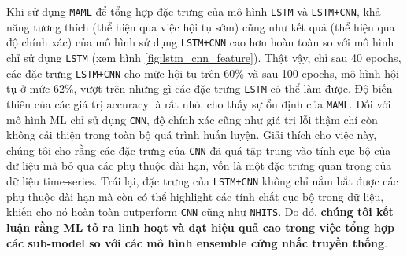 \documentclass[aps,prb,groupedaddress,twocolumn,showpacs,dvipdfmx,superscriptaddress,pdftex]{revtex4-2}
\begin{document}

\vspace{2mm}

Khi sử dụng \verb|MAML| để tổng hợp đặc trưng của mô hình \verb|LSTM| và \verb|LSTM+CNN|, khả năng tương thích (thể hiện qua việc hội tụ sớm) cũng như kết quả (thể hiện qua độ chính xác) của mô hình sử dụng \verb|LSTM+CNN| cao hơn hoàn toàn so với mô hình chỉ sử dụng \verb|LSTM| (xem hình \ref{fig:lstm_cnn_feature}). Thật vậy, chỉ sau 40 epochs, các đặc trưng \verb|LSTM+CNN| cho mức hội tụ trên 60\% và sau 100 epochs, mô hình hội tụ ở mức 62\%, vượt trên những gì các đặc trưng \verb|LSTM| có thể làm được. Độ biến thiên của các giá trị accuracy là rất nhỏ, cho thấy sự ổn định của \verb|MAML|. Đối với mô hình ML chỉ sử dụng \verb|CNN|, độ chính xác cũng như giá trị lỗi thậm chí còn không cải thiện trong toàn bộ quá trình huấn luyện. Giải thích cho việc này, chúng tôi cho rằng các đặc trưng của \verb|CNN| đã quá tập trung vào tính cục bộ của dữ liệu mà bỏ qua các phụ thuộc dài hạn, vốn là một đặc trưng quan trọng của dữ liệu time-series. Trái lại, đặc trưng của \verb|LSTM+CNN| không chỉ nắm bắt được các phụ thuộc dài hạn mà còn có thể highlight các tính chất cục bộ trong dữ liệu, khiến cho nó hoàn toàn outperform \verb|CNN| cũng như \verb|NHITS|. Do đó, \textbf{chúng tôi kết luận rằng ML tỏ ra linh hoạt và đạt hiệu quả cao trong việc tổng hợp các sub-model so với các mô hình ensemble cứng nhắc truyền thống}.
\end{document}
